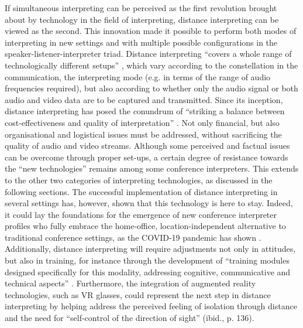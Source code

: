 If simultaneous interpreting can be perceived as the first revolution brought about by technology in the field of interpreting, distance interpreting can be viewed as the second. This innovation made it possible to perform both modes of interpreting in new settings and with multiple possible configurations in the speaker-listener-interpreter triad. Distance interpreting ``covers a whole range of technologically different setups'' \citep[121]{ziegler_present?_2018}, which vary according to the constellation in the communication, the interpreting mode (e.g. in terms of the range of audio frequencies required), but also according to whether only the audio signal or both audio and video data are to be captured and transmitted. Since its inception, distance interpreting has posed the conundrum of ``striking a balance between cost-effectiveness and quality of interpretation'' \citep[36]{baigorri-jalon_conference_1999}. Not only financial, but also organisational and logistical issues must be addressed, without sacrificing the quality of audio and video streams. Although some perceived and factual issues can be overcome through proper set-ups, a certain degree of resistance towards the ``new technologies'' remains among some conference interpreters. This extends to the other two categories of interpreting technologies, as discussed in the following sections. The successful implementation of distance interpreting in several settings has, however, shown that this technology is here to stay. Indeed, it could lay the foundations for the emergence of new conference interpreter profiles who fully embrace the home-office, location-independent alternative to traditional conference settings, as the COVID-19 pandemic has shown \citep{fantinuoli_technological_2019}. Additionally, distance interpreting will require adjustments not only in attitudes, but also in training, for instance through the development of ``training modules designed specifically for this modality, addressing cognitive, communicative and technical aspects'' \citep[137]{ziegler_present?_2018}. Furthermore, the integration of augmented reality technologies, such as VR glasses, could represent the next step in distance interpreting by helping address the perceived feeling of isolation through distance and the need for ``self-control of the direction of sight'' (ibid., p. 136).














